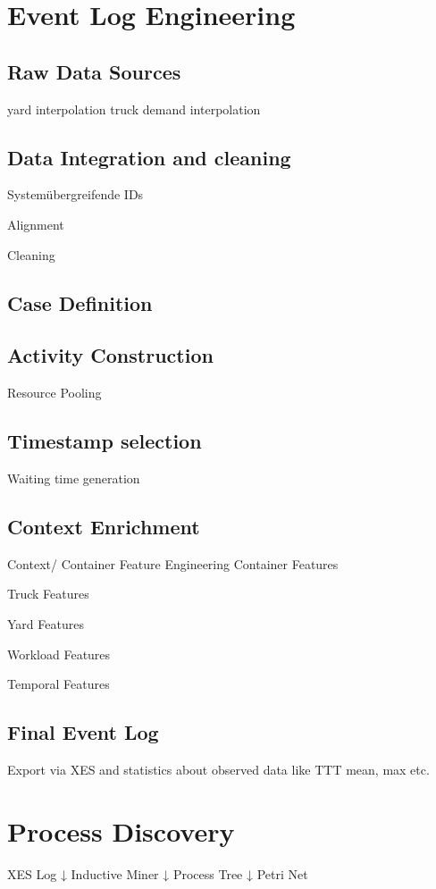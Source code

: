 \section{Event Log Engineering}
\subsection{Raw Data Sources}
yard interpolation
truck demand interpolation
\subsection{Data Integration and cleaning}
Systemübergreifende IDs

Alignment

Cleaning

\subsection{Case Definition}

\subsection{Activity Construction}
Resource Pooling 
\subsection{Timestamp selection}
Waiting time generation
\subsection{Context Enrichment}
Context/ Container Feature Engineering
Container Features

Truck Features

Yard Features

Workload Features

Temporal Features
\subsection{Final Event Log}
Export via XES and statistics about observed data like TTT mean, max etc. 

\section{Process Discovery}
XES Log
        ↓
Inductive Miner
        ↓
Process Tree
        ↓
Petri Net


